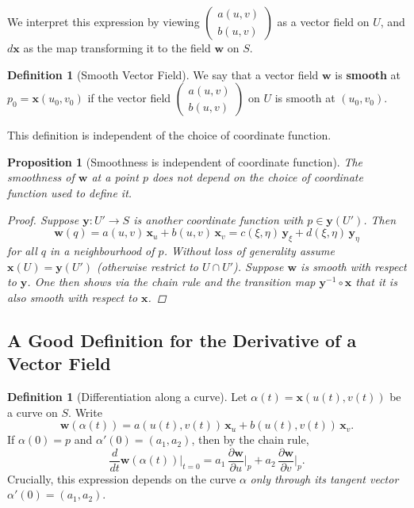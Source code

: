 \documentclass[10pt, a4paper]{article}
\theoremstyle{plain}
\newtheorem{proposition}[theorem]{Proposition}
\theoremstyle{definition}
\newtheorem{definition}[theorem]{Definition}
\theoremstyle{remark}
\begin{document}
We interpret this expression by viewing $\begin{pmatrix} a(u,v) \\ b(u,v) \end{pmatrix}$ as a
vector field on $U$, and $d\mathbf{x}$ as the map transforming it to the field $\mathbf{w}$ on $S$.

\begin{definition}[Smooth Vector Field]
  We say that a vector field $\mathbf{w}$ is \textbf{smooth} at $p_0 = \mathbf{x}(u_0, v_0)$ if
  the vector field $\begin{pmatrix} a(u,v) \\ b(u,v) \end{pmatrix}$ on $U$ is smooth at
  $(u_0, v_0)$.
\end{definition}

This definition is independent of the choice of coordinate function.

\begin{proposition}[Smoothness is independent of coordinate function]
  The smoothness of $\mathbf{w}$ at a point $p$ does not depend on the choice of coordinate
  function used to define it.

  \begin{proof}
    Suppose $\mathbf{y}\colon U' \to S$ is another coordinate function with $p \in \mathbf{y}(U')$.
    Then
    \[
      \mathbf{w}(q)
      = a(u,v)\,\mathbf{x}_u + b(u,v)\,\mathbf{x}_v
      = c(\xi,\eta)\,\mathbf{y}_\xi + d(\xi,\eta)\,\mathbf{y}_\eta
    \]
    for all $q$ in a neighbourhood of $p$. Without loss of generality assume
    $\mathbf{x}(U) = \mathbf{y}(U')$ (otherwise restrict to $U \cap U'$). Suppose $\mathbf{w}$
    is smooth with respect to $\mathbf{y}$. One then shows via the chain rule and the transition
    map $\mathbf{y}^{-1} \circ \mathbf{x}$ that it is also smooth with respect to $\mathbf{x}$.
  \end{proof}
\end{proposition}

\pagebreak
\subsection{A Good Definition for the Derivative of a Vector Field}

\begin{definition}[Differentiation along a curve]
  Let $\alpha(t) = \mathbf{x}(u(t), v(t))$ be a curve on $S$. Write
  \[
    \mathbf{w}(\alpha(t)) = a(u(t), v(t))\,\mathbf{x}_u + b(u(t), v(t))\,\mathbf{x}_v.
  \]
  If $\alpha(0) = p$ and $\alpha'(0) = (a_1, a_2)$, then by the chain rule,
  \[
    \frac{d}{dt}\mathbf{w}(\alpha(t))\bigg|_{t=0}
    = a_1\,\frac{\partial \mathbf{w}}{\partial u}\bigg|_p
    + a_2\,\frac{\partial \mathbf{w}}{\partial v}\bigg|_p.
  \]
  Crucially, this expression depends on the curve $\alpha$ \emph{only through its tangent
  vector} $\alpha'(0) = (a_1, a_2)$.
\end{definition}
\end{document}

